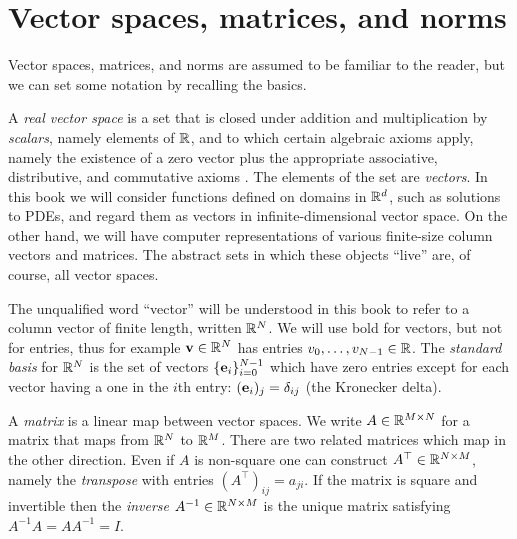 
\section{Vector spaces, matrices, and norms}

Vector spaces, matrices, and norms are assumed to be familiar to the reader, but we can set some notation by recalling the basics.

A \emph{real vector space} is a set that is closed under addition and multiplication by \emph{scalars}, namely elements of $\mathbb{R}$, and to which certain algebraic axioms apply, namely the existence of a zero vector plus the appropriate associative, distributive, and commutative axioms \citep{Strang2009}.  The elements of the set are \emph{vectors}.  In this book we will consider functions defined on domains in $\mathbb{R}^d$, such as solutions to PDEs, and regard them as vectors in infinite-dimensional vector space.  On the other hand, we will have computer representations of various finite-size column vectors and matrices.  The abstract sets in which these objects ``live'' are, of course, all vector spaces.

The unqualified word ``vector'' will be understood in this book to refer to a column vector of finite length, written $\mathbb{R}^N$.  We will use bold for vectors, but not for entries, thus for example $\mathbf{v}\in\mathbb{R}^N$ has entries $v_0,\dots,v_{N-1}\in \mathbb{R}$.  The \emph{standard basis} for $\mathbb{R}^N$ is the set of vectors $\{\mathbf{e}_i\}_{i=0}^{N-1}$ which have zero entries except for each vector having a one in the $i$th entry: $(\mathbf{e}_i)_j = \delta_{ij}$ (the Kronecker delta).

A \emph{matrix} is a linear map between vector spaces.  We write $A\in \mathbb{R}^{M\times N}$ for a matrix that maps from $\mathbb{R}^N$ to $\mathbb{R}^M$.  There are two related matrices which map in the other direction.  Even if $A$ is non-square one can construct $A^\top\in \mathbb{R}^{N\times M}$, namely the \emph{transpose} with entries $(A^\top)_{ij}=a_{ji}$.  If the matrix is square and invertible then the \emph{inverse} $A^{-1}\in \mathbb{R}^{N\times M}$ is the unique matrix satisfying $A^{-1} A = A A^{-1}=I$.

